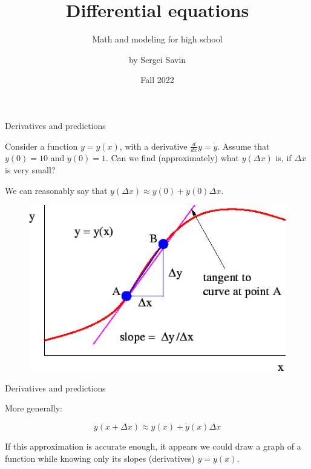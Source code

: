 \documentclass{beamer}
\title{Differential equations}
\subtitle{Math and modeling for high school}
\author{by Sergei Savin}
\date{Fall 2022}
\begin{document}
\maketitle


\begin{frame}{Derivatives and predictions}
	\begin{flushleft}
		
		Consider a function $y = y(x)$, with a derivative $\frac{d}{dx} y = \dot y$. Assume that $y(0) = 10$ and $\dot y (0) = 1$. Can we find (approximately) what $y(\Delta x)$ is, if $\Delta x$ is very small?
		
		\bigskip
		
		We can reasonably say that $y(\Delta x) \approx y(0) + \dot y (0) \Delta x$.
		
		\begin{figure}
			\centering
			\includegraphics[width=0.7\linewidth]{tangent_to_curve2}
			\label{fig:tangenttocurve2}
		\end{figure}
		
		
	\end{flushleft}
\end{frame}



\begin{frame}{Derivatives and predictions}
	\begin{flushleft}
		
		More generally:
		
		 $$y(x + \Delta x) \approx y(x) + \dot y (x) \Delta x$$ 
	
		If this approximation is accurate enough, it appears we could draw a graph of a function while knowing only its slopes (derivatives) $\dot y = \dot y (x)$.
		
		
		
	\end{flushleft}
\end{frame}
\end{document}
